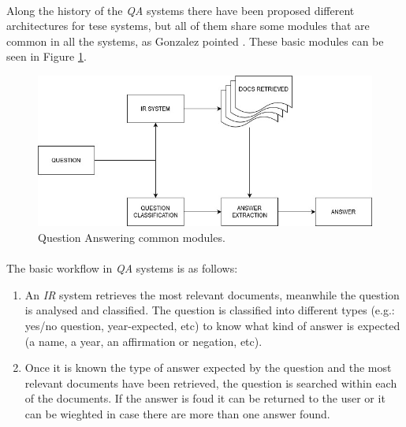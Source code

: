 \paragraph{}
Along the history of the \emph{QA} systems there have been proposed different architectures for tese systems, but all of them share some modules that are common in all the systems, as Gonzalez pointed \cite{Gonzalez2003}. These basic modules can be seen in Figure \ref{fig:qa-modules}.
\begin{figure}[!h]
	\centering
	\includegraphics[scale=0.35]{images/qamodules}
	\caption{Question Answering common modules.}
	\label{fig:qa-modules}
\end{figure}
\paragraph{}
The basic workflow in \emph{QA} systems is as follows: 
\begin{enumerate}
\item An \emph{IR} system retrieves the most relevant documents, meanwhile the question is analysed and classified. The question is classified into different types (e.g.: yes/no question, year-expected, etc) to know what kind of answer is expected (a name, a year, an affirmation or negation, etc).
\item Once it is known the type of answer expected by the question and the most relevant documents have been retrieved, the question is searched within each of the documents. If the answer is foud it can be returned to the user or it can be wieghted in case there are more than one answer found.
\end{enumerate} 
